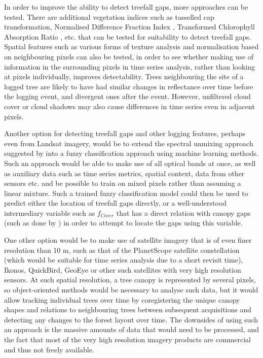 \documentclass[a4paper,12pt]{scrbook}
\begin{document}
In order to improve the ability to detect treefall gaps, more approaches can be tested. There are additional vegetation indices such as tasselled cap transformation, Normalised Difference Fraction Index \citep{souza_combining_2005}, Transformed Chlorophyll Absorption Ratio \citep{haboudane_integrated_2002}, etc. that can be tested for suitability to detect treefall gaps. Spatial features such as various forms of texture analysis and normalisation based on neighbouring pixels can also be tested, in order to see whether making use of information in the surrounding pixels in time series analysis, rather than looking at pixels individually, improves detectability. Trees neighbouring the site of a logged tree are likely to have had similar changes in reflectance over time before the logging event, and divergent ones after the event. However, unfiltered cloud cover or cloud shadows may also cause differences in time series even in adjacent pixels.

Another option for detecting treefall gaps and other logging features, perhaps even from Landsat imagery, would be to extend the spectral unmixing approach suggested by \citet{asner_canopy_2004} into a fuzzy classification approach using machine learning methods. Such an approach would be able to make use of all optical bands at once, as well as auxiliary data such as time series metrics, spatial context, data from other sensors etc. and be possible to train on mixed pixels rather than assuming a linear mixture. Such a trained fuzzy classification model could then be used to predict either the location of treefall gaps directly, or a well-understood intermediary variable such as $f_{Cover}$ that has a direct relation with canopy gaps (such as done by \citet{bacour_neural_2006}) in order to attempt to locate the gaps using this variable.

One other option would be to make use of satellite imagery that is of even finer resolution than 10 m, such as that of the PlanetScope satellite constellation (which would be suitable for time series analysis due to a short revisit time), Ikonos, QuickBird, GeoEye or other such satellites with very high resolution sensors. At such spatial resolution, a tree canopy is represented by several pixels, so object-oriented methods would be necessary to analyse such data, but it would allow tracking individual trees over time by coregistering the unique canopy shapes and relations to neighbouring trees between subsequent acquisitions and detecting any changes to the forest layout over time. The downsides of using such an approach is the massive amounts of data that would need to be processed, and the fact that most of the very high resolution imagery products are commercial and thus not freely available.
\end{document}

